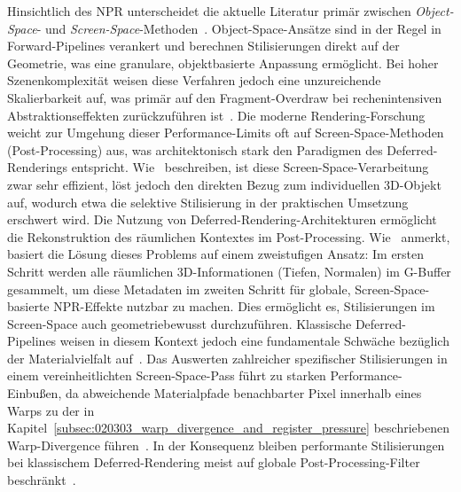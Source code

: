 Hinsichtlich des \ac{NPR} unterscheidet die aktuelle Literatur primär zwischen
\textit{Object-Space}- und
\textit{Screen-Space}-Methoden~\parencite[vgl.][S.~148]{magdicsPostprocessingNPREffects2013}.
Object-Space-Ansätze sind in der Regel in Forward-Pipelines verankert und berechnen Stilisierungen direkt auf
der Geometrie, was eine granulare, objektbasierte Anpassung ermöglicht.
Bei hoher Szenenkomplexität weisen diese Verfahren jedoch eine unzureichende Skalierbarkeit auf, was primär auf den
Fragment-Overdraw bei rechenintensiven Abstraktionseffekten zurückzuführen
ist~\parencite[vgl.][S.~1]{fatahalianReducingShadingGPUs2010}.
Die moderne Rendering-Forschung weicht zur Umgehung dieser Performance-Limits oft auf Screen-Space-Methoden
(Post-Processing) aus, was architektonisch stark den Paradigmen des Deferred-Renderings entspricht.
Wie~\textcite[S.~148]{magdicsPostprocessingNPREffects2013} beschreiben, ist diese Screen-Space-Verarbeitung zwar
sehr effizient, löst jedoch den direkten Bezug zum individuellen 3D-Objekt auf, wodurch etwa die selektive Stilisierung
in der praktischen Umsetzung erschwert wird.
Die Nutzung von Deferred-Rendering-Architekturen ermöglicht die Rekonstruktion des räumlichen Kontextes im
Post-Processing.
Wie~\textcite[Abschn.~3.2]{Thaler2011DeferredRendering} anmerkt, basiert die Lösung dieses Problems auf einem
zweistufigen Ansatz: Im ersten Schritt werden alle räumlichen 3D-Informationen (Tiefen, Normalen) im \ac{G-Buffer}
gesammelt, um diese Metadaten im zweiten Schritt für globale, Screen-Space-basierte \ac{NPR}-Effekte nutzbar zu machen.
Dies ermöglicht es, Stilisierungen im Screen-Space auch geometriebewusst durchzuführen.
Klassische Deferred-Pipelines weisen in diesem Kontext jedoch eine fundamentale Schwäche bezüglich der Materialvielfalt
auf~\parencite[vgl.][S.~1]{haradaForwardBringingDeferred2012}.
Das Auswerten zahlreicher spezifischer Stilisierungen in einem vereinheitlichten Screen-Space-Pass
führt zu starken Performance-Einbußen, da abweichende Materialpfade benachbarter Pixel innerhalb eines Warps
zu der in Kapitel~\ref{subsec:020303_warp_divergence_and_register_pressure} beschriebenen Warp-Divergence
führen~\parencite[vgl.][Abschn.~2.6]{Thaler2011DeferredRendering}.
In der Konsequenz bleiben performante Stilisierungen bei klassischem Deferred-Rendering meist auf globale
Post-Processing-Filter beschränkt~\parencite[vgl.][S.~148]{magdicsPostprocessingNPREffects2013}.

